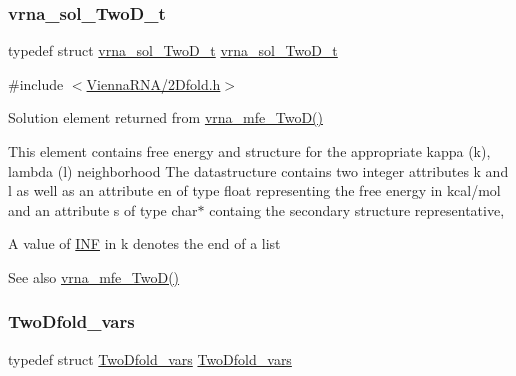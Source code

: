 \subsubsection{\texorpdfstring{vrna\+\_\+sol\+\_\+\+Two\+D\+\_\+t}{vrna\_sol\_TwoD\_t}}
{\footnotesize\ttfamily typedef struct \mbox{\hyperlink{group__kl__neighborhood__mfe_structvrna__sol___two_d__t}{vrna\+\_\+sol\+\_\+\+Two\+D\+\_\+t}}  \mbox{\hyperlink{group__kl__neighborhood__mfe_structvrna__sol___two_d__t}{vrna\+\_\+sol\+\_\+\+Two\+D\+\_\+t}}}



{\ttfamily \#include $<$\mbox{\hyperlink{2_dfold_8h}{Vienna\+R\+N\+A/2\+Dfold.\+h}}$>$}



Solution element returned from \mbox{\hyperlink{group__kl__neighborhood__mfe_ga243c288b463147352829df04de6a2f77}{vrna\+\_\+mfe\+\_\+\+Two\+D()}} 

This element contains free energy and structure for the appropriate kappa (k), lambda (l) neighborhood The datastructure contains two integer attributes \textquotesingle{}k\textquotesingle{} and \textquotesingle{}l\textquotesingle{} as well as an attribute \textquotesingle{}en\textquotesingle{} of type float representing the free energy in kcal/mol and an attribute \textquotesingle{}s\textquotesingle{} of type char$\ast$ containg the secondary structure representative,

A value of \mbox{\hyperlink{energy__const_8h_a12c2040f25d8e3a7b9e1c2024c618cb6}{I\+NF}} in k denotes the end of a list

\begin{DoxySeeAlso}{See also}
\mbox{\hyperlink{group__kl__neighborhood__mfe_ga243c288b463147352829df04de6a2f77}{vrna\+\_\+mfe\+\_\+\+Two\+D()}} 
\end{DoxySeeAlso}
\mbox{\label{group__kl__neighborhood__mfe_gaf4f514010a14f9d59d850742b3e96954}} 
\subsubsection{\texorpdfstring{Two\+Dfold\+\_\+vars}{TwoDfold\_vars}}
{\footnotesize\ttfamily typedef struct \mbox{\hyperlink{group__kl__neighborhood__mfe_struct_two_dfold__vars}{Two\+Dfold\+\_\+vars}}  \mbox{\hyperlink{group__kl__neighborhood__mfe_struct_two_dfold__vars}{Two\+Dfold\+\_\+vars}}}




